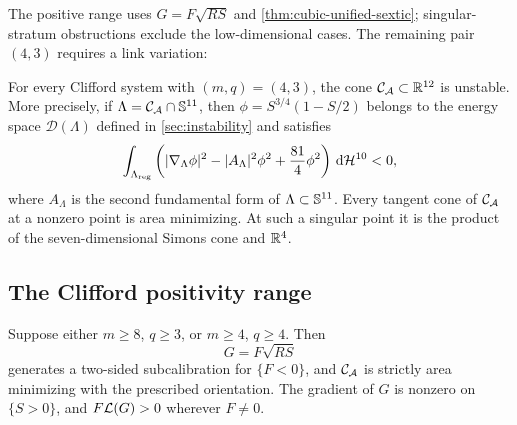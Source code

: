 The positive range uses \(G=F\sqrt{RS}\) and
\cref{thm:cubic-unified-sextic}; singular-stratum obstructions exclude
the low-dimensional cases. The remaining pair \((4,3)\) requires a
link variation:

\begin{theorem}
\label{thm:Clifford-43-instability}
For every Clifford system with \((m,q)=(4,3)\), the cone
\(\mathcal C_\mathcal A\subset\mathbb R^{12}\) is unstable.  More precisely, if
\(\Lambda=\mathcal C_\mathcal A\cap\mathbb S^{11}\), then
\(\phi=S^{3/4}(1-S/2)\) belongs to the energy space
\(\mathcal D(\Lambda)\) defined in
\cref{sec:instability} and satisfies
\[
 \int_{\Lambda_{\mathrm{reg}}}
 \left(|\nabla_\Lambda\phi|^2-|A_\Lambda|^2\phi^2
       +\frac{81}{4}\phi^2\right)\,\mathrm d\mathcal H^{10}<0,
\]
where \(A_\Lambda\) is the second fundamental form of
\(\Lambda\subset\mathbb S^{11}\).
Every tangent cone of \(\mathcal C_\mathcal A\) at a nonzero point is area minimizing.
At such a singular point it is the product of the seven-dimensional Simons
cone and \(\mathbb R^4\).
\end{theorem}

\subsection{The Clifford positivity range}
\label{sec:Clifford-common-potential}

\begin{proposition}
\label{prop:Clifford-common-potential}
Suppose either \(m\geq8\), \(q\geq3\), or \(m\geq4\), \(q\geq4\).
Then
\[
 G=F\sqrt{RS}
\]
generates a two-sided subcalibration for \(\{F<0\}\), and
\(\mathcal C_{\mathcal A}\) is strictly area minimizing with the prescribed orientation.
The gradient of \(G\) is nonzero on \(\{S>0\}\), and
\(F\mathcal L(G)>0\) wherever \(F\ne0\).
\end{proposition}

